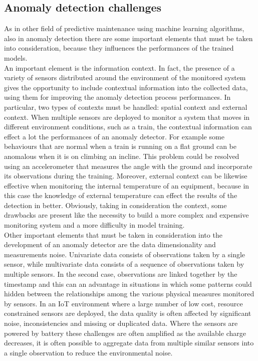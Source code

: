 \subsection{Anomaly detection challenges}
As in other field of predictive maintenance using machine learning algorithms, also in anomaly detection there are some important elements that must be taken into consideration, because they influences the performances of the trained models.\\ An important element is the information context. In fact, the presence of a variety of sensors distributed around the environment of the monitored system gives the opportunity to include contextual information into the collected data, using them for improving the anomaly detection process performances. In particular, two types of contexts must be handled: spatial context and external context. When multiple sensors are deployed to monitor a system that moves in different environment conditions, such as a train, the contextual information can effect a lot the performances of an anomaly detector. For example some behaviours that are normal when a train is running on a flat ground can be anomalous when it is on climbing an incline. This problem could be resolved using an accelerometer that measures the angle with the ground and incorporate its observations during the training. Moreover, external context can be likewise effective when monitoring the internal temperature of an equipment, because in this case the knowledge of external temperature can effect the results of the detection in better. Obviously, taking in consideration the context, some drawbacks are present like the necessity to build a more complex and expensive monitoring system and a more difficulty in model training.\\
Other important elements that must be taken in consideration into the development of an anomaly detector are the data dimensionality and measurements noise. Univariate data consists of observations taken by a single sensor, while multivariate data consists of a sequence of observations taken by multiple sensors. In the second case, observations are linked together by the timestamp and this can an advantage in situations in which some patterns could hidden between the relationships among the various physical measures monitored by sensors. In an IoT environment where a large number of low cost, resource constrained sensors are deployed, the data quality is often affected by significant noise, inconsistencies and missing or duplicated data. Where the sensors are powered by battery these challenges are often amplified as the available charge decreases, it is often possible to aggregate data from multiple similar sensors into a single observation to reduce the environmental noise.\\

